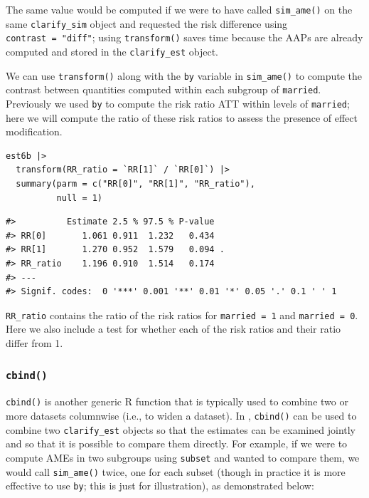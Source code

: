 The same value would be computed if we were to have called \texttt{sim\_ame()} on the same \texttt{clarify\_sim} object and requested the risk difference using \texttt{contrast\ =\ "diff"}; using \texttt{transform()} saves time because the AAPs are already computed and stored in the \texttt{clarify\_est} object.

We can use \texttt{transform()} along with the \texttt{by} variable in \texttt{sim\_ame()} to compute the contrast between quantities computed within each subgroup of \texttt{married}. Previously we used \texttt{by} to compute the risk ratio ATT within levels of \texttt{married}; here we will compute the ratio of these risk ratios to assess the presence of effect modification.

\begin{verbatim}
est6b |>
  transform(RR_ratio = `RR[1]` / `RR[0]`) |>
  summary(parm = c("RR[0]", "RR[1]", "RR_ratio"),
          null = 1)
\end{verbatim}

\begin{verbatim}
#>          Estimate 2.5 % 97.5 % P-value  
#> RR[0]       1.061 0.911  1.232   0.434  
#> RR[1]       1.270 0.952  1.579   0.094 .
#> RR_ratio    1.196 0.910  1.514   0.174  
#> ---
#> Signif. codes:  0 '***' 0.001 '**' 0.01 '*' 0.05 '.' 0.1 ' ' 1
\end{verbatim}

\texttt{RR\_ratio} contains the ratio of the risk ratios for \texttt{married\ =\ 1} and \texttt{married\ =\ 0}. Here we also include a test for whether each of the risk ratios and their ratio differ from 1.

\hypertarget{cbind}{%
\subsubsection{\texorpdfstring{\texttt{cbind()}}{cbind()}}\label{cbind}}

\texttt{cbind()} is another generic R function that is typically used to combine two or more datasets columnwise (i.e., to widen a dataset). In , \texttt{cbind()} can be used to combine two \texttt{clarify\_est} objects so that the estimates can be examined jointly and so that it is possible to compare them directly. For example, if we were to compute AMEs in two subgroups using \texttt{subset} and wanted to compare them, we would call \texttt{sim\_ame()} twice, one for each subset (though in practice it is more effective to use \texttt{by}; this is just for illustration), as demonstrated below:

